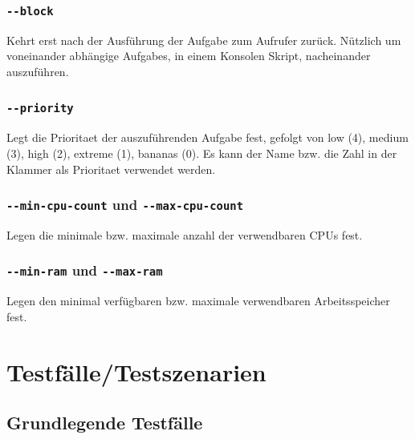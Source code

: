 \documentclass[a4paper,12pt]{article}
\begin{document}
\subsubsection{\texttt{-{}-block}}
Kehrt erst nach der Ausführung der \gls{Aufgabe} zum Aufrufer zurück. Nützlich um voneinander abhängige \glspl{Aufgabe}, in einem Konsolen Skript, nacheinander auszuführen.

\subsubsection{\texttt{-{}-priority}}
Legt die \gls{Prioritaet} der auszuführenden \gls{Aufgabe} fest, gefolgt von low (4), medium (3), high (2), extreme (1), bananas (0).
Es kann der Name bzw. die Zahl in der Klammer als \gls{Prioritaet} verwendet werden.

\subsubsection{\texttt{-{}-min-cpu-count} und \texttt{-{}-max-cpu-count}}
Legen die minimale bzw. maximale anzahl der verwendbaren \glspl{CPU} fest.

\subsubsection{\texttt{-{}-min-ram} und \texttt{-{}-max-ram}}
Legen den minimal verfügbaren bzw. maximale verwendbaren Arbeitsspeicher fest.

\clearpage
\section{Testfälle/Testszenarien}
\subsection{Grundlegende Testfälle}
\end{document}
